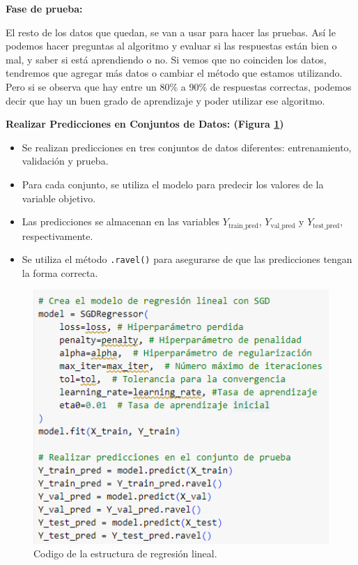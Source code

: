 \vspace{1\baselineskip}
\textbf{Fase de prueba:}

El resto de los datos que quedan, se van a usar para hacer las pruebas. Así le
podemos hacer preguntas al algoritmo y evaluar si las respuestas están bien o
mal, y saber si está aprendiendo o no. Si vemos que no coinciden los datos,
tendremos que agregar más datos o cambiar el método que estamos utilizando.
Pero si se observa que hay entre un 80\% a 90\% de respuestas correctas,
podemos decir que hay un buen grado de aprendizaje y poder utilizar ese
algoritmo.

\vspace{1\baselineskip}
\textbf{Realizar Predicciones en Conjuntos de Datos: (Figura \ref{fig:estructura_lineal_cap3})}

\begin{itemize}
  \item Se realizan predicciones en tres conjuntos de datos diferentes: entrenamiento,
        validación y prueba.
  \item Para cada conjunto, se utiliza el modelo para predecir los valores de la
        variable objetivo.
  \item Las predicciones se almacenan en las variables $Y_{\text{train\_pred}}$,
        $Y_{\text{val\_pred}}$ y $Y_{\text{test\_pred}}$, respectivamente.
  \item Se utiliza el método \texttt{.ravel()} para asegurarse de que las predicciones
        tengan la forma correcta.
\end{itemize}

\begin{figure}[H]
  \begin{center}
    \includegraphics[scale=0.90]{./arquitectura REGRESION LINEAL.png}
    \caption{Codigo de la estructura de regresión lineal.}
    \label{fig:estructura_lineal_cap3}
  \end{center}
\end{figure}

